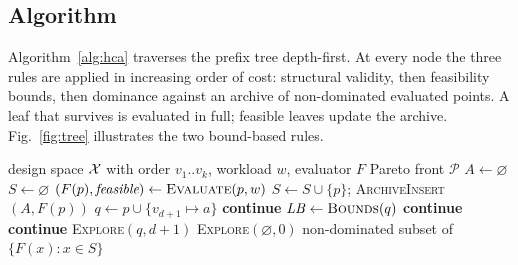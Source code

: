 \subsection{Algorithm}
Algorithm~\ref{alg:hca} traverses the prefix tree depth-first. At every node the three
rules are applied in increasing order of cost: structural validity, then feasibility
bounds, then dominance against an archive of non-dominated evaluated points. A leaf that
survives is evaluated in full; feasible leaves update the archive. Fig.~\ref{fig:tree}
illustrates the two bound-based rules.

\begin{algorithm}[t]
\caption{HCA-DSE}
\label{alg:hca}
\begin{algorithmic}[1]
\Require design space $\mathcal{X}$ with order $v_1..v_k$, workload $w$, evaluator $F$
\Ensure Pareto front $\mathcal{P}$
\State $A\gets\varnothing$ 
\State $S\gets\varnothing$ 
    \State $(F(p),\textit{feasible})\gets\textsc{Evaluate}(p,w)$
     $S\gets S\cup\{p\}$; \textsc{ArchiveInsert}$(A,F(p))$ \EndIf
    \State \Return
  \EndIf
    \State $q\gets p\cup\{v_{d+1}\!\mapsto\!a\}$
     \textbf{continue}  \EndIf
    \State $\mathit{LB}\gets\textsc{Bounds}(q)$ 
     \textbf{continue}
       \EndIf
     \textbf{continue}
       \EndIf
    \State \textsc{Explore}$(q,d+1)$
  \EndFor
\EndProcedure
\State \textsc{Explore}$(\varnothing,0)$
\State \Return non-dominated subset of $\{F(x):x\in S\}$
\end{algorithmic}
\end{algorithm}

